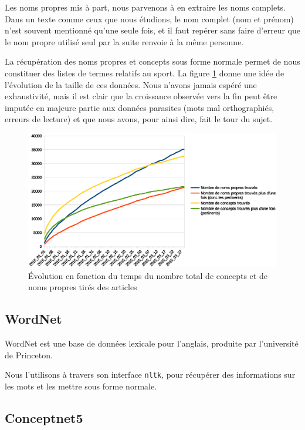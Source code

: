 \documentclass[a4paper, 12pt]{article}
\newcommand{\pyt}[1]{\texttt{#1}}%
\begin{document}
Les noms propres mis à part, nous parvenons à en extraire les noms complets. Dans un texte comme ceux que nous étudions, le nom complet (nom et prénom) n'est souvent mentionné qu'une seule fois, et il faut repérer sans faire d'erreur que le nom propre utilisé seul par la suite renvoie à la même personne.

La récupération des noms propres et concepts sous forme normale permet de nous constituer des listes de termes relatifs au sport. La figure \ref{fig:conceptsnoms} donne une idée de l'évolution de la taille de ces données. Nous n'avons jamais espéré une exhaustivité, mais il est clair que la croissance observée vers la fin peut être imputée en majeure partie aux données parasites (mots mal orthographiés, erreurs de lecture) et que nous avons, pour ainsi dire, fait le tour du sujet.


 \begin{figure}[h]
 \centering
 \includegraphics[width=16cm]{./conceptsnoms.eps}
 \caption{Évolution en fonction du temps du nombre total de concepts et de noms propres tirés des articles}
 \label{fig:conceptsnoms}
\end{figure}



\subsection{WordNet}

WordNet est une base de données lexicale pour l'anglais, produite par l'université de Princeton.

Nous l'utilisons à travers son interface \pyt{nltk}, pour récupérer des informations sur les mots et les mettre sous forme normale.


\subsection{Conceptnet5}
\end{document}
